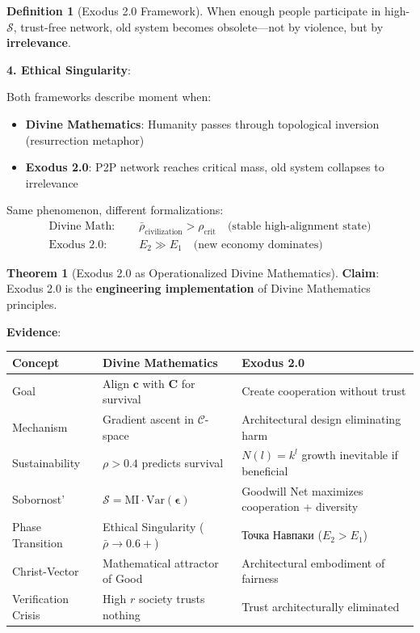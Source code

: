 \documentclass[11pt,a4paper]{article}
\theoremstyle{definition}
\newtheorem{definition}{Definition}[section]
\newtheorem{theorem}{Theorem}[section]
\theoremstyle{remark}
\newcommand{\CC}{\mathcal{C}}
\newcommand{\cc}{\mathbf{c}}
\begin{document}
\begin{enumerate}
\begin{definition}[Exodus 2.0 Framework]
When enough people participate in high-\(\mathcal{S}\), trust-free network, old system becomes obsolete—not by violence, but by \textbf{irrelevance}.

\textbf{4. Ethical Singularity}:

Both frameworks describe moment when:
\begin{itemize}
    \item \textbf{Divine Mathematics}: Humanity passes through topological inversion (resurrection metaphor)
    \item \textbf{Exodus 2.0}: P2P network reaches critical mass, old system collapses to irrelevance
\end{itemize}

Same phenomenon, different formalizations:
\begin{align}
\text{Divine Math: } \quad &\bar{\rho}_{\text{civilization}} > \rho_{\text{crit}} \quad \text{(stable high-alignment state)} \\
\text{Exodus 2.0: } \quad &E_2 \gg E_1 \quad \text{(new economy dominates)}
\end{align}
\end{definition}

\begin{theorem}[Exodus 2.0 as Operationalized Divine Mathematics]
\textbf{Claim}: Exodus 2.0 is the \textbf{engineering implementation} of Divine Mathematics principles.

\textbf{Evidence}:

\begin{tabular}{|p{3.5cm}|p{5cm}|p{5cm}|}
\hline
\textbf{Concept} & \textbf{Divine Mathematics} & \textbf{Exodus 2.0} \\
\hline
Goal & Align \(\cc\) with \(\mathbf{C}\) for survival & Create cooperation without trust \\
\hline
Mechanism & Gradient ascent in \(\CC\)-space & Architectural design eliminating harm \\
\hline
Sustainability & \(\rho > 0.4\) predicts survival & \(N(l) = k^l\) growth inevitable if beneficial \\
\hline
Sobornost' & \(\mathcal{S} = \text{MI} \cdot \text{Var}(\boldsymbol{\epsilon})\) & Goodwill Net maximizes cooperation + diversity \\
\hline
Phase Transition & Ethical Singularity (\(\bar{\rho} \to 0.6+\)) & Точка Навпаки (\(E_2 > E_1\)) \\
\hline
Christ-Vector & Mathematical attractor of Good & Architectural embodiment of fairness \\
\hline
Verification Crisis & High \(r\) society trusts nothing & Trust architecturally eliminated \\
\hline
\end{tabular}


\end{theorem}
\end{enumerate}
\end{document}

